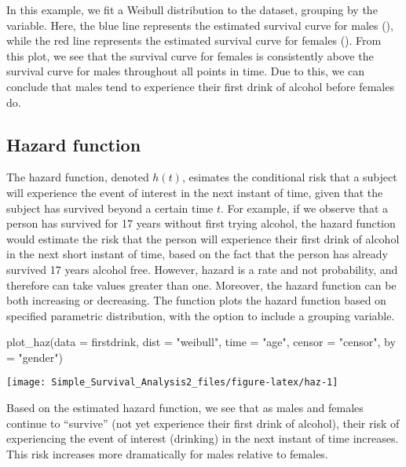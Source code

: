 In this example, we fit a Weibull distribution to the 
dataset, grouping by the  variable. Here, the blue line
represents the estimated survival curve for males (),
while the red line represents the estimated survival curve for females
(). From this plot, we see that the survival curve for
females is consistently above the survival curve for males throughout
all points in time. Due to this, we can conclude that males tend to
experience their first drink of alcohol before females do.

\hypertarget{hazard-function}{%
\subsection{Hazard function}\label{hazard-function}}

The hazard function, denoted \(h(t)\), esimates the conditional risk
that a subject will experience the event of interest in the next instant
of time, given that the subject has survived beyond a certain time
\(t\). For example, if we observe that a person has survived for 17
years without first trying alcohol, the hazard function would estimate
the risk that the person will experience their first drink of alcohol in
the next short instant of time, based on the fact that the person has
already survived 17 years alcohol free. However, hazard is a rate and
not probability, and therefore can take values greater than one.
Moreover, the hazard function can be both increasing or decreasing. The
 function plots the hazard function based on specified
parametric distribution, with the option to include a grouping variable.

\begin{Schunk}
\begin{Sinput}
plot_haz(data = firstdrink, dist = "weibull", time = "age", censor = "censor",  by = "gender")
\end{Sinput}

\texttt{[image: Simple\_Survival\_Analysis2\_files/figure-latex/haz-1]} \end{Schunk}

Based on the estimated hazard function, we see that as males and females
continue to ``survive'' (not yet experience their first drink of
alcohol), their risk of experiencing the event of interest (drinking) in
the next instant of time increases.\\
This risk increases more dramatically for males relative to females.

